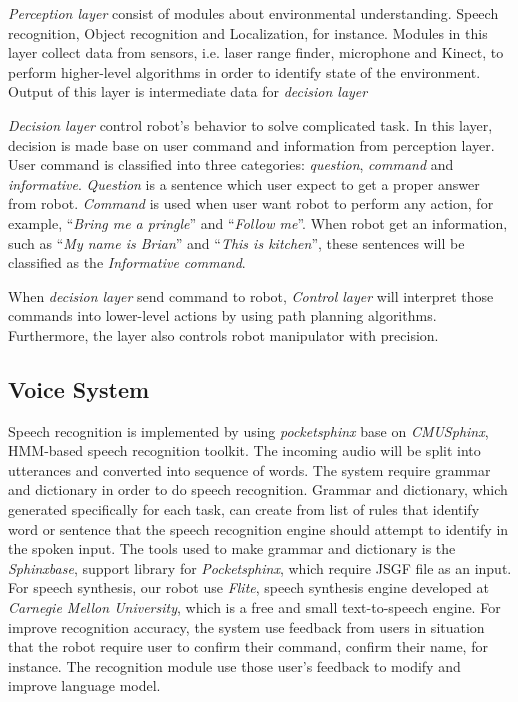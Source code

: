 \documentclass{llncs}
\newcommand{\dq}[1]{``#1''}
\begin{document}
\textit{Perception layer} consist of modules about environmental understanding. Speech recognition, Object recognition and Localization, for instance. Modules in this layer collect data from sensors, i.e. laser range finder, microphone and Kinect, to perform higher-level algorithms in order to identify state of the environment. Output of this layer is intermediate data for \textit{decision layer}

\textit{Decision layer} control robot's behavior to solve complicated task. In this layer, decision is made base on user command and information from perception layer. User command is classified into three categories: \textit{question}, \textit{command} and \textit{informative}. \textit{Question} is a sentence which user expect to get a proper answer from robot. \textit{Command} is used when user want robot to perform any action, for example, \dq{\textit{Bring me a pringle}} and \dq{\textit{Follow me}}. When robot get an information, such as \dq{\textit{My name is Brian}} and \dq{\textit{This is kitchen}}, these sentences will be classified as the \textit{Informative command}.

When \textit{decision layer} send command to robot, \textit{Control layer} will interpret those commands into lower-level actions by using path planning algorithms. Furthermore, the layer also controls robot manipulator with precision.

\subsection{Voice System}

Speech recognition is implemented by using \textit{pocketsphinx} base on \textit{CMUSphinx}, HMM-based speech recognition toolkit. The incoming audio will be split into utterances and converted into sequence of words. The system require grammar and dictionary in order to do speech recognition. Grammar and dictionary, which generated specifically for each task, can create from list of rules that identify word or sentence that the speech recognition engine should attempt to identify in the spoken input. The tools used to make grammar and dictionary is the \textit{Sphinxbase}, support library for \textit{Pocketsphinx}, which require JSGF file as an input. For speech synthesis, our robot use \textit{Flite}, speech synthesis engine developed at \textit{Carnegie Mellon University}, which is a free and small text-to-speech engine. For improve recognition accuracy, the system use feedback from users in situation that the robot require user to confirm their command, confirm their name, for instance. The recognition module use those user's feedback to modify and improve language model.
\end{document}
